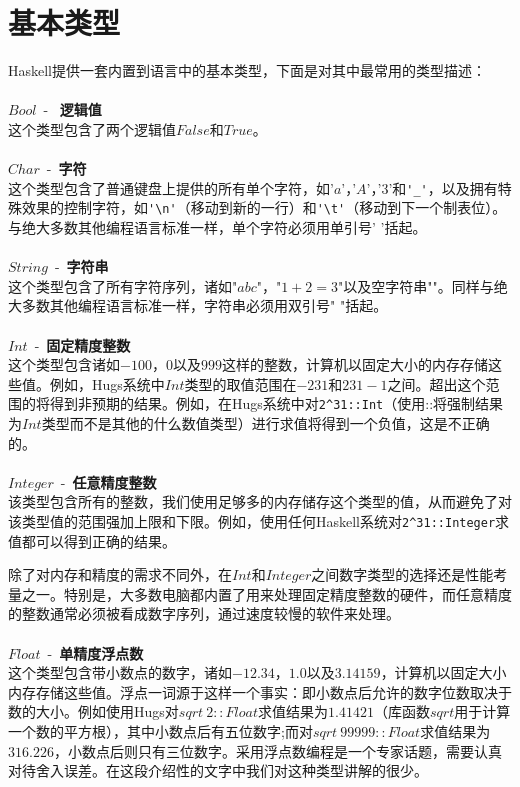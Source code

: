 \section{基本类型}
\noindent Haskell提供一套内置到语言中的基本类型，下面是对其中最常用的类型描述：
\\
\\
$Bool$~-~ \textbf{逻辑值}\\
这个类型包含了两个逻辑值$False$和$True$。
\\
\\
$Char$~-~\textbf{字符}\\
这个类型包含了普通键盘上提供的所有单个字符，如'$a$'，'$A$'，'$3$'和\verb|'_'|，以及拥有特殊效果的控制字符，如\verb|'\n'|（移动到新的一行）和\verb|'\t'|（移动到下一个制表位）。与绝大多数其他编程语言标准一样，单个字符必须用单引号' '括起。
\\
\\
$String$~-~\textbf{字符串}\\
这个类型包含了所有字符序列，诸如"$abc$"，"$1+2=3$"以及空字符串""。同样与绝大多数其他编程语言标准一样，字符串必须用双引号" "括起。
\\
\\
$Int$~-~\textbf{固定精度整数}\\
这个类型包含诸如$-100$，$0$以及$999$这样的整数，计算机以固定大小的内存存储这些值。例如，Hugs系统中$Int$类型的取值范围在$-231$和$231-1$之间。超出这个范围的将得到非预期的结果。例如，在Hugs系统中对\verb|2^31::Int|（使用::将强制结果为$Int$类型而不是其他的什么数值类型）进行求值将得到一个负值，这是不正确的。
\\
\\
$Integer$~-~\textbf{任意精度整数}\\
该类型包含所有的整数，我们使用足够多的内存储存这个类型的值，从而避免了对该类型值的范围强加上限和下限。例如，使用任何Haskell系统对\verb|2^31::Integer|求值都可以得到正确的结果。

除了对内存和精度的需求不同外，在$Int$和$Integer$之间数字类型的选择还是性能考量之一。特别是，大多数电脑都内置了用来处理固定精度整数的硬件，而任意精度的整数通常必须被看成数字序列，通过速度较慢的软件来处理。
\\
\\
$Float$~-~\textbf{单精度浮点数}\\
这个类型包含带小数点的数字，诸如$-12.34$，$1.0$以及$3.14159$，计算机以固定大小内存存储这些值。浮点一词源于这样一个事实：即小数点后允许的数字位数取决于数的大小。例如使用Hugs对$sqrt ~2 :: Float$求值结果为$1.41421$（库函数$sqrt$用于计算一个数的平方根），其中小数点后有五位数字;而对$sqrt~99999::Float$求值结果为$316.226$，小数点后则只有三位数字。采用浮点数编程是一个专家话题，需要认真对待舍入误差。在这段介绍性的文字中我们对这种类型讲解的很少。

